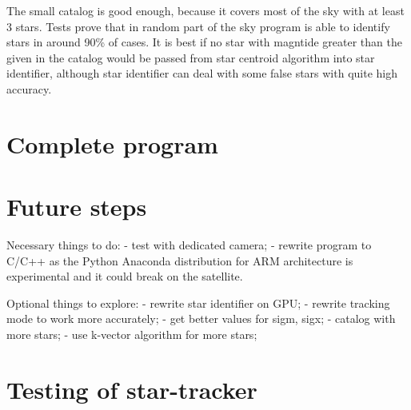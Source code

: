 \documentclass[12pt,a4paper,oneside]{article}
\begin{document}
The small catalog is good enough, because it covers most of the sky with at least 3 stars. Tests prove that in random part of the sky program is able to identify stars in around 90\% of cases. It is best if no star with magntide greater than the given in the catalog would be passed from star centroid algorithm into star identifier, although star identifier can deal with some false stars with quite high accuracy.

\newpage
\section{Complete program}

\newpage
\section{Future steps}

Necessary things to do:
- test with dedicated camera;
- rewrite program to C/C++ as the Python Anaconda distribution for ARM architecture is experimental and it could break on the satellite.

Optional things to explore:
- rewrite star identifier on GPU;
- rewrite tracking mode to work more accurately;
- get better values for sigm, sigx;
- catalog with more stars;
- use k-vector algorithm for more stars;


\newpage
\section{Testing of star-tracker}
\citet{tappe2011star}

\newpage






\newpage

\listoftables

\newpage

\listoffigures

\newpage
\end{document}
